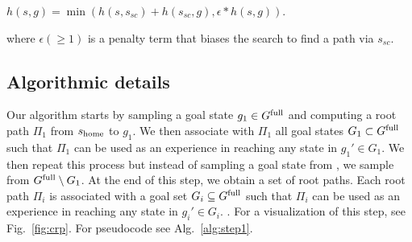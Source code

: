 \documentclass[conference]{IEEEtran}
\begin{document}
\begin{center}
 $h(s,g) = \min(h(s,s_{sc}) + h(s_{sc},g), \epsilon * h(s,g))$.
\end{center}

where $\epsilon (\geq 1)$ is a penalty term that biases the search to find a path via $s_{sc}$.

\subsection{Algorithmic details}
Our algorithm starts by sampling a goal state $g_1 \in G^{\textrm{full}}$ and computing a root path $\Pi_1$ from $s_{\textrm{home}}$ to $g_1$. We then associate with $\Pi_1$ all goal states $G_1 \subset G^{\textrm{full}}$ such that $\Pi_1$ can be used as an experience in reaching any state in $g_1' \in G_1$.
%
We then repeat this process but instead of sampling  a goal state from \Gfull, we sample from $G^{\textrm{full}} \setminus G_1$.
At the end of this step, we obtain a set of root paths. Each root path $\Pi_i$ is associated with a goal set $G_i \subseteq G^{\textrm{full}}$ such that $\Pi_i$ can be used as an experience in reaching any state in $g_i' \in G_i$.
.
%
For a visualization of this step, see Fig.~\ref{fig:crp}.
For pseudocode see Alg.~\ref{alg:step1}.
\end{document}

